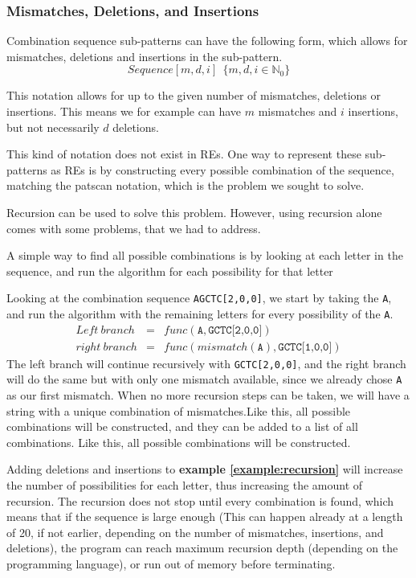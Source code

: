\documentclass[12pt]{article}
\theoremstyle{definition}
\begin{document}
\subsubsection{Mismatches, Deletions, and Insertions}

Combination sequence sub-patterns can have the following form, which allows for mismatches, deletions and insertions in the sub-pattern. 
\begin{equation}
	Sequence[m, d, i] \ \ \{m, d, i \in \mathbb{N}_0 \}
\end{equation} 

This notation allows for up to the given number of mismatches, deletions or insertions. This means we for example can have $m$ mismatches and $i$ insertions, but not necessarily $d$ deletions.

This kind of notation does not exist in REs. One way to represent these sub-patterns as REs is by constructing every possible combination of the sequence, matching the patscan notation, which is the problem we sought to solve.

Recursion can be used to solve this problem. However, using recursion alone comes with some problems, that we had to address. 

A simple way to find all possible combinations is by looking at each letter in the sequence, and run the algorithm for each possibility for that letter

\begin{example}[label=example:recursion]
Looking at the combination sequence \texttt{AGCTC[2,0,0]}, we start by taking the \texttt{A}, and run the algorithm with the remaining letters for every possibility of the \texttt{A}.
\begin{eqnarray}
	Left\ branch &=& func(\texttt{A}, \texttt{GCTC[2,0,0]}) \\
	right\ branch &=& func(mismatch(\texttt{A}), \texttt{GCTC[1,0,0]})
\end{eqnarray}
The left branch will continue recursively with \texttt{GCTC[2,0,0]}, and the right branch will do the same but with only one mismatch available, since we already chose \texttt{A} as our first mismatch. When no more recursion steps can be taken, we will have a string with a unique combination of mismatches.Like this, all possible combinations will be constructed, and they can be added to a list of all combinations. Like this, all possible combinations will be constructed.
\end{example}

Adding deletions and insertions to \textbf{example \ref{example:recursion}} will increase the number of possibilities for each letter, thus increasing the amount of recursion. The recursion does not stop until every combination is found, which means that if the sequence is large enough (This can happen already at a length of 20, if not earlier, depending on the number of mismatches, insertions, and deletions), the program can reach maximum recursion depth (depending on the programming language), or run out of memory before terminating.
\end{document}
